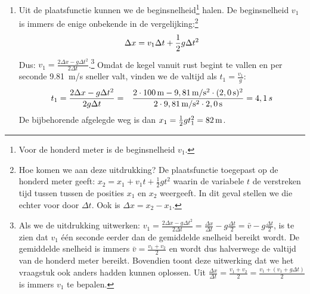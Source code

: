 \begin{exercise}
\begin{oplossing}
\begin{enumerate}
\item Uit de plaatsfunctie kunnen we de beginsnelheid\footnote{Voor de honderd meter is de beginsnelheid $v_1$.} halen. De beginsnelheid $v_1$ is immers de enige onbekende in de vergelijking:\footnote{Hoe komen we aan deze uitdrukking? De plaatsfunctie toegepast op de honderd meter geeft: $x_2=x_1+v_1t+\frac{1}{2}gt^2$ waarin de variabele $t$ de verstreken tijd tussen tussen de posities $x_1$ en $x_2$ weergeeft. In dit geval stellen we die echter voor door $\Delta t$. Ook is $\Delta x=x_2-x_1$.}
\begin{equation*}
\Delta x=v_1\Delta t+\frac{1}{2}g\Delta t^2\\
\end{equation*}
Dus: $v_1=\frac{2\Delta x-g\Delta t^2}{2\Delta t}$.\footnote{Als we de uitdrukking uitwerken: $v_1=\frac{2\Delta x-g\Delta t^2}{2\Delta t}=\frac{\Delta x}{\Delta t}-g\frac{\Delta t}{2}=\bar{v}-g\frac{\Delta t}{2}$, is te zien dat $v_1$ \'e\'en seconde eerder dan de gemiddelde snelheid bereikt wordt. De gemiddelde snelheid is immers $\bar{v}=\frac{v_1+v_2}{2}$ en wordt dus halverwege de valtijd van de honderd meter bereikt. Bovendien toont deze uitwerking dat we het vraagstuk ook anders hadden kunnen oplossen. Uit $\frac{\Delta x}{\Delta t}=\frac{v_1+v_2}{2}=\frac{v_1+(v_1+g\Delta t)}{2}$ is immers $v_1$ te bepalen.}
Omdat de kegel vanuit rust begint te vallen en per seconde \SI{9,81}{m/s} sneller valt, vinden we de valtijd als $t_1=\frac{v_1}{g}$:
\begin{eqnarray*}
t_1=\frac{2\Delta x-g\Delta t^2}{2g\Delta t}&=&\frac{2\cdot100\rm\,m-9,81\rm\,m/s^2\cdot(2,0\rm\,s)^2}{2\cdot9,81\rm\,m/s^2\cdot2,0\rm\,s}=4,1\,s
\end{eqnarray*}
De bijbehorende afgelegde weg is dan $x_1=\frac{1}{2}gt_1^2=82\rm\,m$.
\end{enumerate}
\end{oplossing}

\end{exercise}
